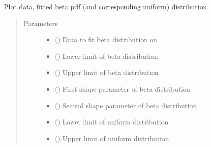 \documentclass[letterpaper,10pt,english,openany,oneside]{sphinxmanual}
\begin{document}

\begin{fulllineitems}
\label{\detokenize{pygpc:pygpc.Visualization.plot_beta_pdf_fit}}
Plot data, fitted beta pdf (and corresponding uniform) distribution
\begin{quote}\begin{description}
\item[{Parameters}] \leavevmode\begin{itemize}
\item {} 
 () \textendash{} Data to fit beta distribution on

\item {} 
 () \textendash{} Lower limit of beta distribution

\item {} 
 () \textendash{} Upper limit of beta distribution

\item {} 
 () \textendash{} First shape parameter of beta distribution

\item {} 
 () \textendash{} Second shape parameter of beta distribution

\item {} 
 (\sphinxstyleliteralemphasis{\sphinxupquote{ (}}\sphinxstyleliteralemphasis{\sphinxupquote{)}}) \textendash{} Lower limit of uniform distribution

\item {} 
 (\sphinxstyleliteralemphasis{\sphinxupquote{ (}}\sphinxstyleliteralemphasis{\sphinxupquote{)}}) \textendash{} Upper limit of uniform distribution


\end{itemize}
\end{description}
\end{quote}
\end{fulllineitems}
\end{document}
